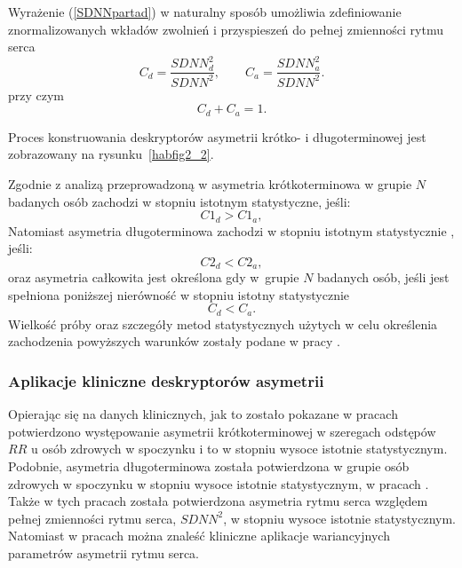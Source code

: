 Wyrażenie (\ref{SDNNpartad}) w naturalny sposób umożliwia zdefiniowanie	znormalizowanych
wkładów zwolnień i przyspieszeń do pełnej zmienności rytmu serca \cite{annals}
\begin{equation}
C_{d}= \frac{SDNN_{d}^{2}}{SDNN^{2}},\qquad C_{a}= \frac{SDNN_{a}^{2}}{SDNN^{2}}\label{SDNNcontrib}.
\end{equation}
przy czym
\begin{equation}
C_{d}+C_{a}=1.
\end{equation}

Proces konstruowania deskryptorów asymetrii krótko- i długoterminowej jest zobrazowany na
rysunku~\ref{habfig2_2}{.}

Zgodnie z analizą przeprowadzoną w \cite{geomasy,annals} asymetria krótkoterminowa w grupie $N$
badanych osób zachodzi w stopniu istotnym statystyczne, jeśli: 
\begin{equation}
C1_{d}>C1_{a},
\end{equation} 
Natomiast asymetria długoterminowa zachodzi w stopniu istotnym statystycznie \cite{annals}, jeśli:
\begin{equation}
C2_{d}<C2_{a},
\end{equation}
oraz asymetria całkowita jest określona gdy w~grupie $N$ badanych osób, jeśli jest
spełniona poniższej nierówność w stopniu istotny statystycznie \cite{annals}
\begin{equation}
C_{d}<C_{a}.
\end{equation}
Wielkość próby oraz szczegóły metod statystycznych użytych w celu określenia zachodzenia
powyższych warunków zostały podane w pracy \cite{geomasy}.

\subsubsection{Aplikacje kliniczne deskryptorów asymetrii}

Opierając się na danych klinicznych, jak to zostało pokazane w pracach \cite{guasym, biomed, geomasy, annals} 
potwierdzono występowanie asymetrii krótkoterminowej w szeregach odstępów $RR$ u osób 
zdrowych w spoczynku i to w stopniu wysoce istotnie statystycznym. Podobnie, asymetria
długoterminowa została potwierdzona w grupie osób zdrowych w spoczynku w stopniu wysoce
istotnie statystycznym, w pracach \cite{guasym, annals}. Także w tych pracach została potwierdzona
asymetria rytmu serca względem pełnej zmienności rytmu serca, $SDNN^2$, w stopniu wysoce
istotnie statystycznym. Natomiast w pracach \cite{berlinPrzemek, asym1, asym2, asym4, car} można znaleść kliniczne aplikacje
wariancyjnych parametrów asymetrii rytmu serca.

